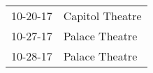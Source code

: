 \begin{supertabular}{p{0.25\columnwidth}p{0.75\columnwidth}}
 10-20-17 &  Capitol Theatre \\
 10-27-17 &   Palace Theatre \\
 10-28-17 &   Palace Theatre \\
\end{supertabular}
